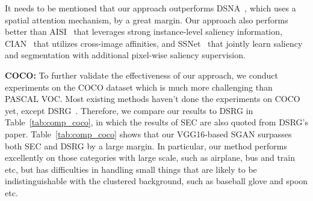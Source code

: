 \documentclass[journal]{IEEEtran}
\begin{document}
It needs to be mentioned that our approach outperforms DSNA~\cite{Zhang2019attention}, which uses a spatial attention mechanism, by a great margin. Our approach also performs better than AISI~\cite{fan2018associating} that leverages strong instance-level saliency information, CIAN~\cite{fan2018cian} that utilizes cross-image affinities, and SSNet~\cite{Zeng_2019_ICCV} that jointly learn saliency and segmentation with additional pixel-wise saliency supervision. 

\textbf{COCO:} To further validate the effectiveness of our approach, we conduct experiments on the COCO dataset which is much more challenging than PASCAL VOC. Most existing methods haven't done the experiments on COCO yet, except DSRG~\cite{huang2018weakly}. Therefore, we compare our results to DSRG in Table~\ref{tab:comp_coco}, in which the results of SEC are also quoted from DSRG's paper. Table~\ref{tab:comp_coco} shows that our VGG16-based SGAN surpasses both SEC and DSRG by a large margin. In particular, our method performs excellently on those categories with large scale, such as airplane, bus and train etc, but has difficulties in handling small things that are likely to be indistinguishable with the clustered background, such as baseball glove and spoon etc.
\end{document}
